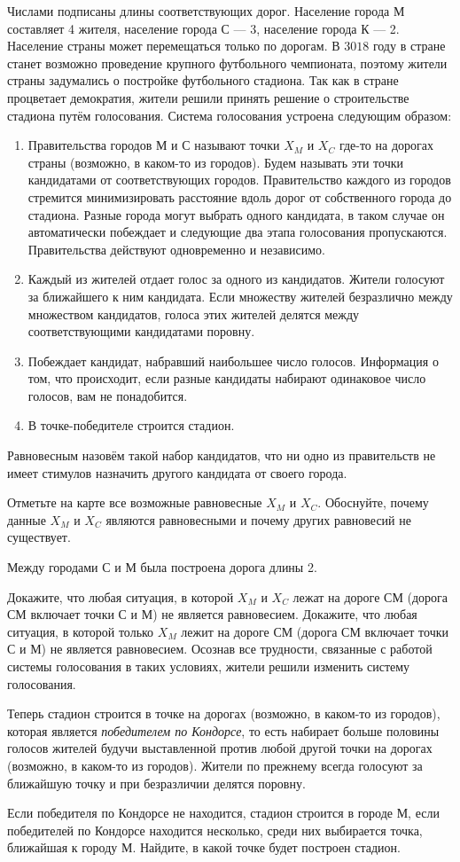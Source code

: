 \documentclass[12pt,a4paper]{extarticle}
\begin{document}
{%
Числами подписаны длины соответствующих дорог. Население города М составляет 4 жителя, население города С --- 3, население города К --- 2. Население страны может перемещаться только по дорогам.
В $3018$ году в стране станет возможно проведение крупного футбольного чемпионата, поэтому жители страны задумались о постройке футбольного стадиона. Так как в стране процветает демократия, жители решили принять решение о строительстве стадиона путём голосования. Система голосования устроена следующим образом:
\begin{enumerate}
    \item Правительства городов М и С называют точки $X_M$ и $X_C$ где-то на дорогах страны (возможно, в каком-то из городов). Будем называть эти точки кандидатами от соответствующих городов. Правительство каждого из городов стремится минимизировать расстояние вдоль дорог от собственного города до стадиона. Разные города могут выбрать одного кандидата, в таком случае он автоматически побеждает и следующие два этапа голосования пропускаются. Правительства действуют одновременно и независимо.
    \item Каждый из жителей отдает голос за одного из кандидатов. Жители голосуют за ближайшего к ним кандидата. Если множеству жителей безразлично между множеством кандидатов, голоса этих жителей делятся между соответствующими кандидатами поровну.
    \item Побеждает кандидат, набравший наибольшее число голосов. Информация о том, что происходит, если разные кандидаты набирают одинаковое число голосов, вам не понадобится.
    \item В точке-победителе строится стадион.
\end{enumerate}
Равновесным назовём такой набор кандидатов, что ни одно из правительств не имеет стимулов назначить другого кандидата от своего города.
}{
\n Отметьте на карте все возможные равновесные $X_M$ и $X_C$. Обоснуйте, почему данные $X_M$ и $X_C$ являются равновесными и почему других равновесий не существует.

Между городами С и М была построена дорога длины 2.

\n Докажите, что любая ситуация, в которой $X_M$ и $X_C$ лежат на дороге СМ (дорога СМ включает точки С и М) не является равновесием.
\n Докажите, что любая ситуация, в которой только $X_M$ лежит на дороге СМ (дорога СМ включает точки С и М) не является равновесием.
\n Осознав все трудности, связанные с работой системы голосования в таких условиях, жители решили изменить систему голосования.

Теперь стадион строится в точке на дорогах (возможно, в каком-то из городов), которая является \textit{победителем по Кондорсе}, то есть набирает больше половины голосов жителей будучи выставленной против любой другой точки на дорогах (возможно, в каком-то из городов). Жители по прежнему всегда голосуют за ближайшую точку и при безразличии делятся поровну.

Если победителя по Кондорсе не находится, стадион строится в городе М, если победителей по Кондорсе находится несколько, среди них выбирается точка, ближайшая к городу М. Найдите, в какой точке будет построен стадион.
}
\end{document}
